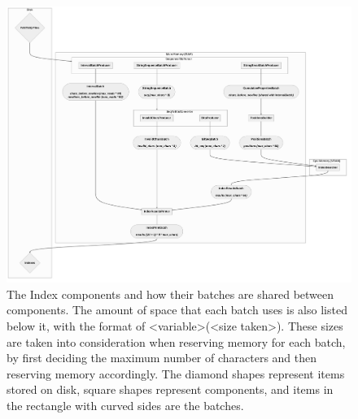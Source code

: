 \begin{figure}[h!]
  \centering
  \includegraphics[width=\textwidth]{images/IndexBatches.png}
  \caption{The Index components and how their batches are shared between components. The amount of space that each batch uses is also listed below it, with the format of <variable>(<size taken>). These sizes are taken into consideration when reserving memory for each batch, by first deciding the maximum number of characters and then reserving memory accordingly. The diamond shapes represent items stored on disk, square shapes represent components, and items in the rectangle with curved sides are the batches.}\label{fig:IndexBatches}
\end{figure}


